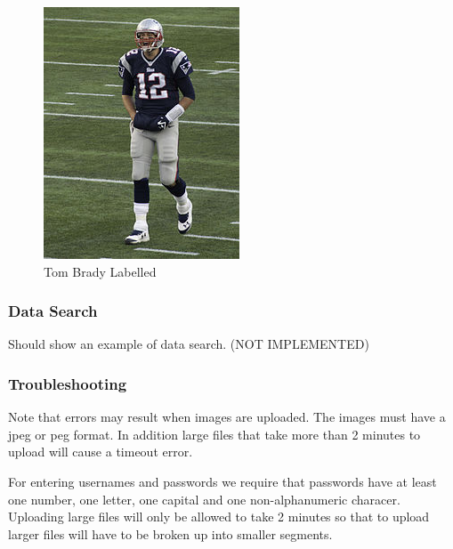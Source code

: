 \documentclass{scrreprt}
\begin{document}
\begin{figure}
  \includegraphics[width=\linewidth]{tbrady.jpg}
  \caption{Tom Brady Labelled}
  \label{fig:labelledBrady}
\end{figure}


\subsubsection{Data Search}

Should show an example of data search. (NOT IMPLEMENTED)


\subsubsection{Troubleshooting}

Note that errors may result when images are uploaded.  The images must have a
jpeg or peg format.  In addition large files that take more than 2 minutes to
upload will cause a timeout error.

For entering usernames and passwords we require that passwords have at least
one number, one letter, one capital and one non-alphanumeric characer.
Uploading large files will only be allowed to take 2 minutes so that to upload
larger files will have to be broken up into smaller segments.
\end{document}
